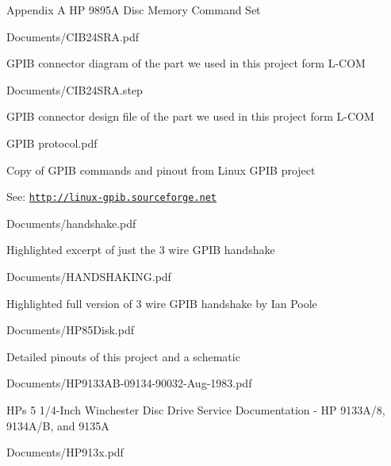 \begin{DoxyItemize}
\begin{DoxyItemize}
\item Appendix A HP 9895A Disc Memory Command Set
\end{DoxyItemize}
\item Documents/\+C\+I\+B24\+S\+R\+A.\+pdf
\begin{DoxyItemize}
\item G\+P\+IB connector diagram of the part we used in this project form L-\/\+C\+OM
\end{DoxyItemize}
\item Documents/\+C\+I\+B24\+S\+R\+A.\+step
\begin{DoxyItemize}
\item G\+P\+IB connector design file of the part we used in this project form L-\/\+C\+OM
\end{DoxyItemize}
\item G\+P\+IB protocol.\+pdf
\begin{DoxyItemize}
\item Copy of G\+P\+IB commands and pinout from Linux G\+P\+IB project
\item See\+: \href{http://linux-gpib.sourceforge.net}{\tt http\+://linux-\/gpib.\+sourceforge.\+net}
\end{DoxyItemize}
\item Documents/handshake.\+pdf
\begin{DoxyItemize}
\item Highlighted excerpt of just the 3 wire G\+P\+IB handshake
\end{DoxyItemize}
\item Documents/\+H\+A\+N\+D\+S\+H\+A\+K\+I\+N\+G.\+pdf
\begin{DoxyItemize}
\item Highlighted full version of 3 wire G\+P\+IB handshake by Ian Poole
\end{DoxyItemize}
\item Documents/\+H\+P85\+Disk.\+pdf
\begin{DoxyItemize}
\item Detailed pinouts of this project and a schematic
\end{DoxyItemize}
\item Documents/\+H\+P9133\+A\+B-\/09134-\/90032-\/\+Aug-\/1983.\+pdf
\begin{DoxyItemize}
\item H\+Ps 5 1/4-\/\+Inch Winchester Disc Drive Service Documentation -\/ HP 9133\+A/8, 9134\+A/B, and 9135A
\end{DoxyItemize}
\item Documents/\+H\+P913x.\+pdf

\end{DoxyItemize}
